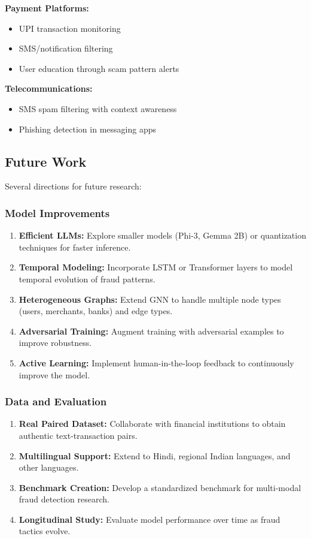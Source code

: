 \textbf{Payment Platforms:}
\begin{itemize}
    \item UPI transaction monitoring
    \item SMS/notification filtering
    \item User education through scam pattern alerts
\end{itemize}

\textbf{Telecommunications:}
\begin{itemize}
    \item SMS spam filtering with context awareness
    \item Phishing detection in messaging apps
\end{itemize}

\subsection{Future Work}

Several directions for future research:

\subsubsection{Model Improvements}

\begin{enumerate}
    \item \textbf{Efficient LLMs:} Explore smaller models (Phi-3, Gemma 2B) or quantization techniques for faster inference.
    \item \textbf{Temporal Modeling:} Incorporate LSTM or Transformer layers to model temporal evolution of fraud patterns.
    \item \textbf{Heterogeneous Graphs:} Extend GNN to handle multiple node types (users, merchants, banks) and edge types.
    \item \textbf{Adversarial Training:} Augment training with adversarial examples to improve robustness.
    \item \textbf{Active Learning:} Implement human-in-the-loop feedback to continuously improve the model.
\end{enumerate}

\subsubsection{Data and Evaluation}

\begin{enumerate}
    \item \textbf{Real Paired Dataset:} Collaborate with financial institutions to obtain authentic text-transaction pairs.
    \item \textbf{Multilingual Support:} Extend to Hindi, regional Indian languages, and other languages.
    \item \textbf{Benchmark Creation:} Develop a standardized benchmark for multi-modal fraud detection research.
    \item \textbf{Longitudinal Study:} Evaluate model performance over time as fraud tactics evolve.
\end{enumerate}

